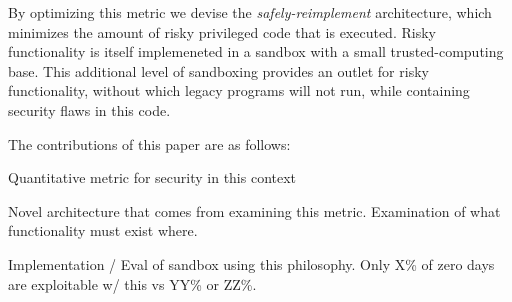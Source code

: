 By optimizing this metric   we devise the \emph{safely-reimplement}
architecture, which minimizes the amount of risky privileged code that is
executed.  
Risky functionality is itself implemeneted in a sandbox with
a small trusted-computing base.  
This additional level of sandboxing 
provides an outlet for risky functionality, without which legacy programs
will not run, while containing security flaws in this code.  

The contributions of this paper are as follows:

Quantitative metric for security in this context

Novel architecture that comes from examining this metric.  Examination of
what functionality must exist where.

Implementation / Eval of sandbox using this philosophy.  
Only X\% of zero days are exploitable w/ this vs YY\% or ZZ\%.



